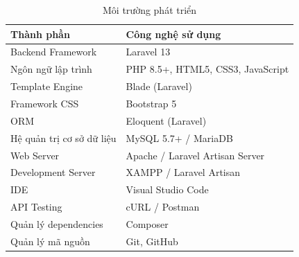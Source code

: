 \begin{table}[H]
\centering
\caption{Môi trường phát triển}
\label{tab:development_environment}

\begin{tabularx}{\textwidth}{|l|X|}
\hline
\textbf{Thành phần} & \textbf{Công nghệ sử dụng} \\
\hline
Backend Framework & Laravel 13 \\
\hline
Ngôn ngữ lập trình & PHP 8.5+, HTML5, CSS3, JavaScript \\
\hline
Template Engine & Blade (Laravel) \\
\hline
Framework CSS & Bootstrap 5 \\
\hline
ORM & Eloquent (Laravel) \\
\hline
Hệ quản trị cơ sở dữ liệu & MySQL 5.7+ / MariaDB \\
\hline
Web Server & Apache / Laravel Artisan Server \\
\hline
Development Server & XAMPP / Laravel Artisan \\
\hline
IDE & Visual Studio Code \\
\hline
API Testing & cURL / Postman \\
\hline
Quản lý dependencies & Composer \\
\hline
Quản lý mã nguồn & Git, GitHub \\
\hline
\end{tabularx}

\end{table}

